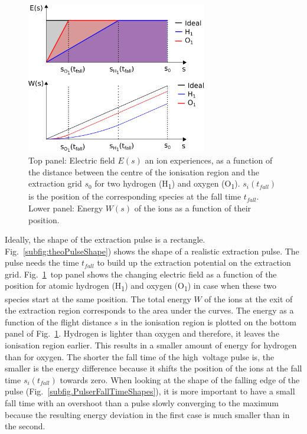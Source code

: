 	\begin{figure}[h!] %
		\centering
		\includegraphics[width= 0.7\textwidth]{Bilder/PulsInt.png}
		\caption{Top panel: Electric field $E(s)$ an ion experiences, as a function of the distance between the centre of the ionisation region and the extraction grid $s_0$ for two hydrogen (H\textsubscript{1}) and oxygen (O\textsubscript{1}). $s_i(t_{fall})$ is the position of the corresponding species at the fall time $t_{fall}$. Lower panel: Energy $W(s)$ of the ions as a function of their position.}
		\label{fig:PulsInt}
	\end{figure}
	
	Ideally, the shape of the extraction pulse is a rectangle. Fig.~\ref{subfig:theoPulseShape}) shows the shape of a realistic extraction pulse. The pulse needs the time $t_{fall}$ to build up the extraction potential on the extraction grid. Fig.~\ref{fig:PulsInt}~top panel shows the changing electric field as a function of the position for atomic hydrogen (H\textsubscript{1}) and oxygen (O\textsubscript{1}) in case when these two species start at the same position. The total energy $W$ of the ions at the exit of the extraction region corresponds to the area under the curves. The energy as a function of the flight distance $s$ in the ionisation region is plotted on the bottom panel of Fig.~\ref{fig:PulsInt}. Hydrogen is lighter than oxygen and therefore, it leaves the ionisation region earlier. This results in a smaller amount of energy for hydrogen than for oxygen. The shorter the fall time of the high~voltage pulse is, the smaller is the energy difference because it shifts the position of the ions at the fall time $s_i(t_{fall})$ towards zero. When looking at the shape of the falling edge of the pulse (Fig.~\ref{subfig.PulserFallTimeShapes}), it is more important to have a small fall time with an overshoot than a pulse slowly converging to the maximum because the resulting energy deviation in the first case is much smaller than in the second.\\
	
